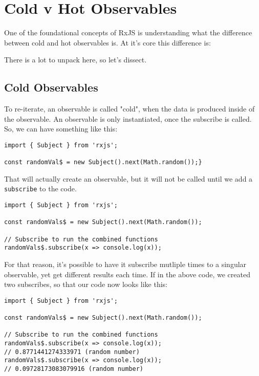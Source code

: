 \chapter{Cold v Hot Observables}
One of the foundational concepts of RxJS is understanding what the 
difference between cold and hot observables is. At it's core this difference is:
\begin{quote}
\end{quote}

There is a lot to unpack here, so let's dissect. 

\section{Cold Observables}
To re-iterate, an observable is called "cold", when the data is produced inside of the observable. An observable is only instantiated, once the
subscribe is called. So, we can have something like this: 

\begin{lstlisting}[caption=observable without subscribe]
import { Subject } from 'rxjs';

const randomVal$ = new Subject().next(Math.random());}
\end{lstlisting}
That will actually create an observable, but it will not be called until we add a \lstinline{subscribe} to the code. 

\begin{lstlisting}[caption=observable with subscribe]
import { Subject } from 'rxjs';

const randomVals$ = new Subject().next(Math.random());

// Subscribe to run the combined functions
randomVals$.subscribe(x => console.log(x));
\end{lstlisting}

For that reason, it's possible to have it subscribe mutliple times to a singular observable, yet get different results each time. If in the above 
code, we created two subscribes, so that our code now looks like this: 
\begin{lstlisting}[caption=observable with two subscribes]
import { Subject } from 'rxjs';

const randomVals$ = new Subject().next(Math.random());

// Subscribe to run the combined functions
randomVals$.subscribe(x => console.log(x));
// 0.8771441274333971 (random number)
randomVals$.subscribe(x => console.log(x));
// 0.09728173083079916 (random number)
\end{lstlisting}


